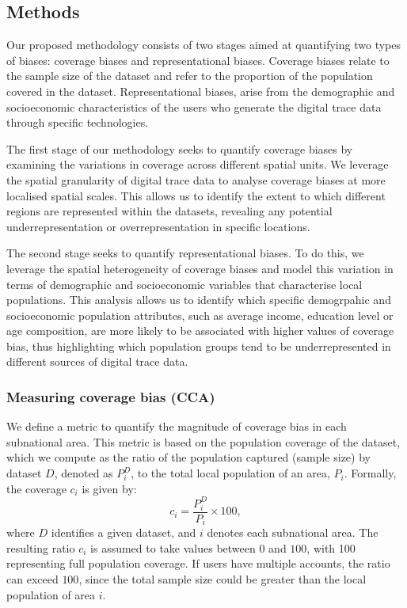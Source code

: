 \documentclass[]{rsos}%
\begin{document}
\subsection{Methods}\label{methods}

Our proposed methodology consists of two stages aimed at quantifying two
types of biases: coverage biases and representational biases. Coverage
biases relate to the sample size of the dataset and refer to the
proportion of the population covered in the dataset. Representational
biases, arise from the demographic and socioeconomic characteristics of
the users who generate the digital trace data through specific
technologies.

The first stage of our methodology seeks to quantify coverage biases by
examining the variations in coverage across different spatial units. We
leverage the spatial granularity of digital trace data to analyse
coverage biases at more localised spatial scales. This allows us to
identify the extent to which different regions are represented within
the datasets, revealing any potential underrepresentation or
overrepresentation in specific locations.

The second stage seeks to quantify representational biases. To do this,
we leverage the spatial heterogeneity of coverage biases and model this
variation in terms of demographic and socioeconomic variables that
characterise local populations. This analysis allows us to identify
which specific demogrpahic and socioeconomic population attributes, such
as average income, education level or age composition, are more likely
to be associated with higher values of coverage bias, thus highlighting
which population groups tend to be underrepresented in different sources
of digital trace data.

\subsubsection{Measuring coverage bias (CCA)}\label{measuring-coverage-bias-cca}

We define a metric to quantify the magnitude of coverage bias in each
subnational area. This metric is based on the population coverage of the
dataset, which we compute as the ratio of the population captured
(sample size) by dataset \(D\), denoted as \(P_i^D\), to the total local
population of an area, \(P_i\). Formally, the coverage \(c_i\) is given by:
\begin{equation}
c_i = \dfrac{P_i^D}{P_i} \times 100,
\end{equation} where \(D\) identifies a given dataset, and \(i\) denotes
each subnational area. The resulting ratio \(c_i\) is assumed to take
values between \(0\) and \(100\), with 100 representing full population
coverage. If users have multiple accounts, the ratio can exceed \(100\),
since the total sample size could be greater than the local population
of area \(i\).
\end{document}
